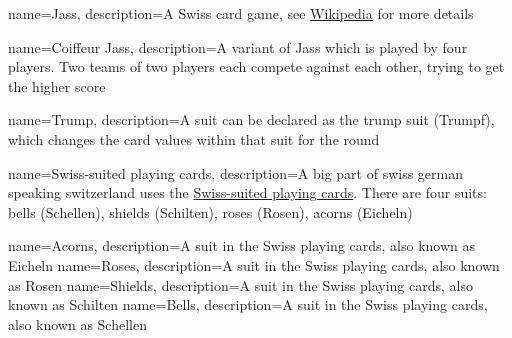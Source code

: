 {
  name={Jass},
  description={A Swiss card game, see \href{https://en.wikipedia.org/wiki/Jass}{Wikipedia} for more details}
}

{
  name={Coiffeur Jass},
  description={A variant of Jass which is played by four players.
  Two teams of two players each compete against each other, trying to get the higher score}
}

{
  name={Trump},
  description={A suit can be declared as the trump suit (Trumpf), which changes the card values within that suit for the round}
}

{
  name={Swiss-suited playing cards},
  description={A big part of swiss german speaking switzerland uses the \href{https://en.wikipedia.org/wiki/Swiss-suited_playing_cards}{Swiss-suited playing cards}.
  There are four suits: \gls{bells} (Schellen), \gls{shields} (Schilten), \gls{roses} (Rosen), \gls{acorns} (Eicheln)}
}

 { name={Acorns}, description={A suit in the Swiss playing cards, also known as Eicheln} }
 { name={Roses}, description={A suit in the Swiss playing cards, also known as Rosen} }
 { name={Shields}, description={A suit in the Swiss playing cards, also known as Schilten} }
 { name={Bells}, description={A suit in the Swiss playing cards, also known as Schellen} }





